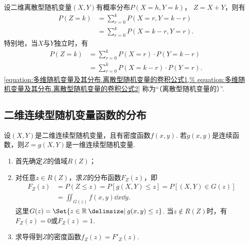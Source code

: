 \begin{theorem}\label{theorem:多维随机变量及其分布.离散型随机变量的卷积公式}
设二维离散型随机变量\((X,Y)\)有概率分布\(P(X=h,Y=k)\)，
\(Z=X+Y\)，则有\begin{align}
	P(Z=k)
	&= \sum_{r=0}^k P(X=r,Y=k-r) \\
	&= \sum_{r=0}^k P(X=k-r,Y=r).
\end{align}
特别地，当\(X\)与\(Y\)独立时，有\begin{align}
	P(Z=k)
	&= \sum_{r=0}^k P(X=r) \cdot P(Y=k-r) \label{equation:多维随机变量及其分布.离散型随机变量的卷积公式1} \\
	&= \sum_{r=0}^k P(X=k-r) \cdot P(Y=r). \label{equation:多维随机变量及其分布.离散型随机变量的卷积公式2}
\end{align}
\rm\cref{equation:多维随机变量及其分布.离散型随机变量的卷积公式1,%
equation:多维随机变量及其分布.离散型随机变量的卷积公式2}
称为“（离散型随机变量的）”.
\end{theorem}

\subsection{二维连续型随机变量函数的分布}
设\((X,Y)\)是二维连续型随机变量，且有密度函数\(f(x,y)\).
若\(g(x,y)\)是连续函数，则\(Z = g(X,Y)\)是一维连续型随机变量.
\begin{enumerate}
\item 首先确定\(Z\)的值域\(R(Z)\)；
\item 对任意\(z \in R(Z)\)，求\(Z\)的分布函数\(F_Z(z)\)，即\begin{align*}
F_Z(z) &= P(Z \leq z)
= P[g(X,Y) \leq z]
= P[(X,Y) \in G(z)] \\
&= \iint_{G(z)} f(x,y) \dd{x}\dd{y}.
\end{align*}
这里\(G(z) = \Set{ z\in\mathbb{R} \given g(x,y) \leq z }\).
当\(z \notin R(Z)\)时，有\(F_Z(z)=0\)或\(F_Z(z)=1\).
\item 求导得到\(Z\)的密度函数\(f_Z(z) = F'_Z(z)\).
\end{enumerate}

